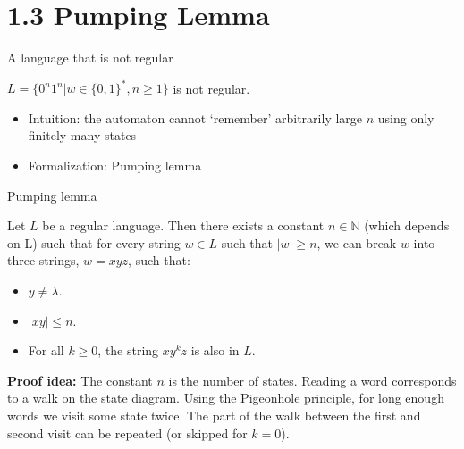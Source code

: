 \documentclass[handout]{beamer}
\begin{document}
\section{1.3 Pumping Lemma}


\begin{frame}{A language that is not regular}

    \begin{example}
        $L=\{0^n1^n|  w\in \{0,1\}^*,n\geq 1\}$ is not regular.
    \end{example}

    \begin{itemize}
        \item \alert{Intuition:} the automaton cannot `remember' arbitrarily large $n$ using only finitely many states    
    
        \item \alert{Formalization:} Pumping lemma
    \end{itemize}
    
\end{frame}


\begin{frame}{Pumping lemma}

    \begin{theorem}
		Let $L$ be a regular language. Then there exists a constant $n\in \mathbb{N}$ (which depends on L) such that for every string $w\in L$ such that $|w|\geq n$, we can break $w$ into three strings, $w=xyz$, such that:
		
		\begin{itemize}
			\item $y\neq \lambda$.
			\item $|xy|\leq n$.
			\item For all $k\geq 0$, the string $xy^kz$ is also in $L$.
		\end{itemize}
	\end{theorem}

    \textbf{Proof idea:} The constant $n$ is the number of states. Reading a word corresponds to a walk on the state diagram. Using the Pigeonhole principle, for long enough words we visit some state twice. The part of the walk between the first and second visit can be repeated (or skipped for $k=0$).

\end{frame}
\end{document}
